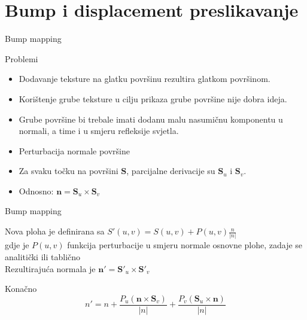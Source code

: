 \documentclass[9pt]{beamer}
\begin{document}
\section{Bump i displacement preslikavanje}
\begin{frame}{Bump mapping}
	\begin{block}{Problemi}
		\begin{itemize}
			\item Dodavanje teksture na glatku površinu rezultira glatkom površinom.
			\item Korištenje grube teksture u cilju prikaza grube površine nije dobra ideja.
			\item Grube površine bi trebale imati dodanu malu nasumičnu komponentu u normali, a time i u smjeru refleksije svjetla.
		\end{itemize}
	\end{block}
	\begin{itemize}
		\item Perturbacija normale površine
		\item Za svaku točku na površini $\mathbf{S}$, parcijalne derivacije su $\mathbf{S}_u$ i $\mathbf{S}_v$. 
		\item Odnosno: $\mathbf{n} = \mathbf{S}_u \times\mathbf{S}_v$
	\end{itemize}
\end{frame}	
%
\begin{frame}{Bump mapping}
	\begin{block}{}
		Nova ploha je definirana sa $S'(u,v) = S(u,v) + P(u,v)\frac{n}{|n|}$ \\
		gdje je $P(u,v)$ funkcija perturbacije u smjeru normale osnovne plohe, zadaje se analitički ili tablično\\
		Rezultirajuća normala je $\mathbf{n'} = \mathbf{S'}_{u} \times \mathbf{S'}_{v}$ 
	\end{block}
	
	\begin{block}{Konačno}
		$$n' = n + \frac{P_{u}(\mathbf{n} \times \mathbf{S}_{v})}{|n|} + \frac{P_{v}(\mathbf{S}_{u} \times \mathbf{n})}{|n|}$$
	\end{block}
\end{frame}
%
\end{document}

